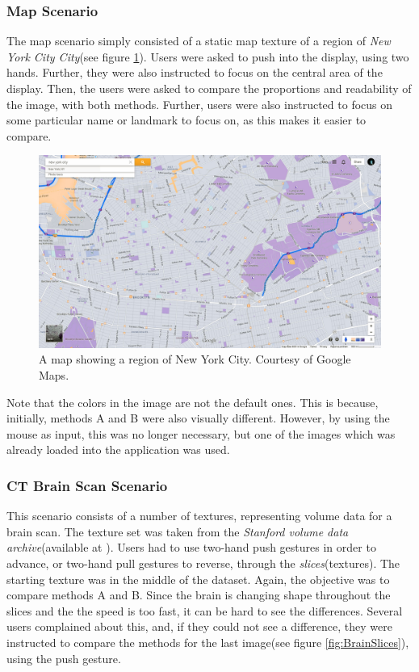 \documentclass[]{article}
\begin{document}
\subsubsection{Map Scenario}

The map scenario simply consisted of a static map texture of a region of \textit{New York City City}(see figure \ref{fig:Map}). Users were asked to push into the display, using two hands. Further, they were also instructed to focus on the central area of the display. Then, the users were asked to compare the proportions and readability of the image, with both methods. Further, users were also instructed to focus on some particular name or landmark to focus on, as this makes it easier to compare.


\begin{figure}[!hbtp]
    \centering
    \includegraphics[width=1.0\textwidth]{figures/NYMidZoomA.jpg}
    \caption{A map showing a region of New York City. Courtesy of Google Maps.}
    \label{fig:Map}
\end{figure}

Note that the colors in the image are not the default ones. This is because, initially, methods A and B were also visually different. However, by using the mouse as input, this was no longer necessary, but one of the images which was already loaded into the application was used.

\subsubsection{CT Brain Scan Scenario}

This scenario consists of a number of textures, representing volume data for a brain scan. The texture set was taken from the \textit{Stanford volume data archive}(available at \cite{levoy2001}). Users had to use two-hand push gestures in order to advance, or two-hand pull gestures to reverse, through the \textit{slices}(textures). The starting texture was in the middle of the dataset. Again, the objective was to compare methods A and B. Since the brain is changing shape throughout the slices and the the speed is too fast, it can be hard to see the differences. Several users complained about this, and, if they could not see a difference, they were instructed to compare the methods for the last image(see figure \ref{fig:BrainSlices}), using the push gesture.
\end{document}
